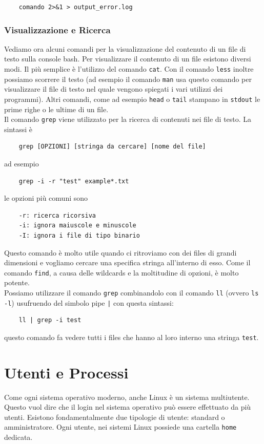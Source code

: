 \begin{verbatim}
	comando 2>&1 > output_error.log
\end{verbatim}

\subsection{Visualizzazione e Ricerca}
Vediamo ora alcuni comandi per la visualizzazione del contenuto di un file di testo sulla console bash. Per visualizzare il contenuto di un file esistono diversi modi. Il più semplice è l'utilizzo del comando \verb"cat". Con il comando \verb"less" inoltre possiamo scorrere il testo (ad esempio il comando \verb"man" usa questo comando per visualizzare il file di testo nel quale vengono spiegati i vari utilizzi dei programmi). Altri comandi, come ad esempio \verb"head" o \verb"tail" stampano in \verb"stdout" le prime righe o le ultime di un file.\\
Il comando \verb"grep" viene utilizzato per la ricerca di contenuti nei file di testo. La sintassi è
\begin{verbatim}
	grep [OPZIONI] [stringa da cercare] [nome del file]
\end{verbatim} 
ad esempio

\begin{verbatim}
	grep -i -r "test" example*.txt
\end{verbatim}
le opzioni più comuni sono
\begin{verbatim}
	-r: ricerca ricorsiva
	-i: ignora maiuscole e minuscole
	-I: ignora i file di tipo binario
\end{verbatim}

Questo comando è molto utile quando ci ritroviamo con dei files di grandi dimensioni e vogliamo cercare una specifica stringa all'interno di esso. Come il comando \verb"find", a causa delle wildcards e la moltitudine di opzioni, è molto potente. \\
Possiamo utilizzare il comando \verb"grep" combinandolo con il comando \verb"ll" (ovvero \verb"ls -l") usufruendo del simbolo pipe \verb"|" con questa sintassi:
\begin{verbatim}
	ll | grep -i test
\end{verbatim}
questo comando fa vedere tutti i files che hanno al loro interno una stringa \verb"test".

\chapter{Utenti e Processi}
Come ogni sistema operativo moderno, anche Linux è un sistema multiutente. Questo vuol dire che il login nel sistema operativo può essere effettuato da più utenti. Esistono fondamentalmente due tipologie di utente: standard o amministratore. Ogni utente, nei sistemi Linux possiede una cartella \verb"home" dedicata. \\

